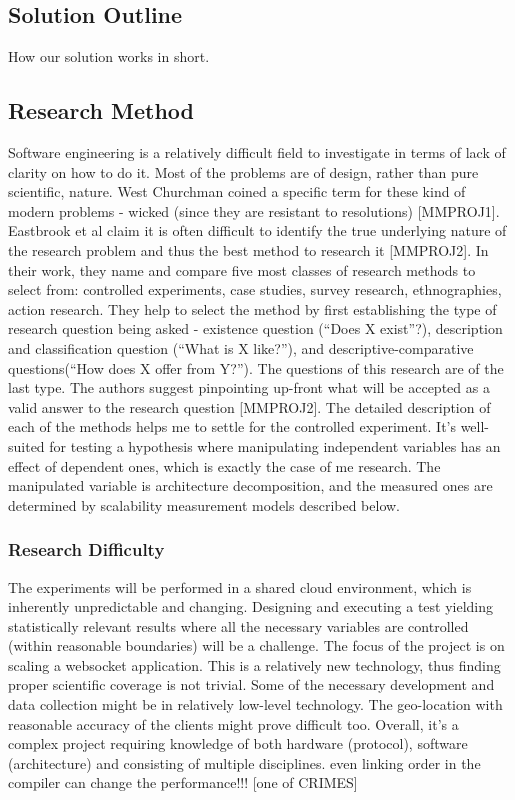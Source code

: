 \documentclass{uvamscse}
\begin{document}
\subsection{Solution Outline}
How our solution works in short.
\subsection{Research Method}
Software engineering is a relatively difficult field to investigate in terms of lack of clarity on how to do it. Most of the problems are of design, rather than pure scientific, nature. West Churchman coined a specific term for these kind of modern problems - wicked (since they are resistant to resolutions) [MMPROJ1]. Eastbrook et al claim it is often difficult to identify the true underlying nature of the research problem and thus the best method to research it [MMPROJ2]. In their work, they name and compare five most classes of research methods to select from: controlled experiments, case studies, survey research, ethnographies, action research. They help to select the method by first establishing the type of research question being asked - existence question (“Does X exist”?), description and classification question (“What is X like?”), and descriptive-comparative questions(“How does X offer from Y?”). The questions of this research are of the last type. The authors suggest pinpointing up-front what will be accepted as a valid answer to the research question [MMPROJ2]. The detailed description of each of the methods helps me to settle for the controlled experiment. It’s well-suited for testing a hypothesis where manipulating independent variables has an effect of dependent ones, which is exactly the case of me research. The manipulated variable is architecture decomposition, and the measured ones are determined by scalability measurement models described below.
\subsubsection{Research Difficulty}
The experiments will be performed in a shared cloud environment, which is inherently unpredictable and changing. Designing and executing a test yielding statistically relevant results where all the necessary variables are controlled (within reasonable boundaries) will be a challenge.
The focus of the project is on scaling a websocket application. This is a relatively new technology, thus finding proper scientific coverage is not trivial.
Some of the necessary development and data collection might be in relatively low-level technology.
The geo-location with reasonable accuracy of the clients might prove difficult too.
Overall, it’s a complex project requiring knowledge of both hardware (protocol), software (architecture) and consisting of multiple disciplines.
even linking order in the compiler can change the performance!!! [one of CRIMES]
\end{document}
